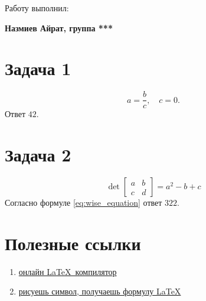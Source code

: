 \documentclass{article}
\begin{document}
		\begin{center}
			Работу выполнил:
            
            \textbf{Назмиев Айрат, группа ***}
		\end{center}

		\section*{Задача 1}
			\begin{equation}
				a = \frac{b}{c}, \quad c = 0.
			\end{equation}		
			Ответ $42$. 
		\section*{Задача 2}
			\begin{equation}\label{eq:wise_equation}
				\det \begin{bmatrix}
					a & b \\
					c & d
				\end{bmatrix} = a^2 - b + c
			\end{equation}		
			Согласно формуле \ref{eq:wise_equation} ответ $322$. 
			
	\newpage
	\section*{Полезные ссылки}%
	\label{sec:Полезные ссылки}
		\begin{enumerate}
			\item \href{https://www.overleaf.com/project}{онлайн \LaTeX\  компилятор}
			\item \href{https://detexify.kirelabs.org/classify.html}{рисуешь символ, получаешь формулу \LaTeX}
		\end{enumerate}	
\end{document}
